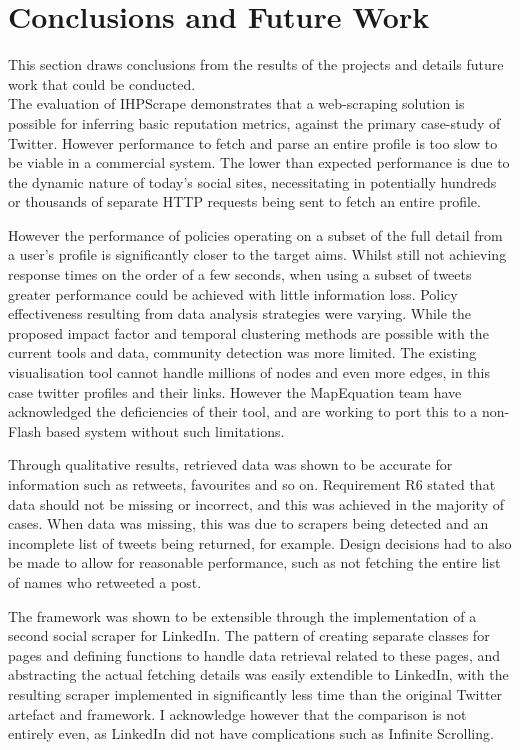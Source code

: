 \chapter{Conclusions and Future Work}\label{C:us}

This section draws conclusions from the results of the projects and details future work that could be conducted.\\

\noindent The evaluation of IHPScrape demonstrates that a web-scraping solution is possible for inferring basic reputation metrics, against the primary case-study of Twitter. However performance to fetch and parse an entire profile is too slow to be viable in a commercial system. The lower than expected performance is due to the dynamic nature of today's social sites, necessitating in potentially hundreds or thousands of separate HTTP requests being sent to fetch an entire profile. 

However the performance of policies operating on a subset of the full detail from a user's profile is significantly closer to the target aims. Whilst still not achieving response times on the order of a few seconds, when using a subset of tweets greater performance could be achieved with little information loss. Policy effectiveness resulting from data analysis strategies were varying. While the proposed impact factor and temporal clustering methods are possible with the current tools and data, community detection was more limited. The existing visualisation tool cannot handle millions of nodes and even more edges, in this case twitter profiles and their links. However the MapEquation team have acknowledged the deficiencies of their tool, and are working to port this to a non-Flash based system without such limitations. 

Through qualitative results, retrieved data was shown to be accurate for information such as retweets, favourites and so on. Requirement R6 stated that data should not be missing or incorrect, and this was achieved in the majority of cases. When data was missing, this was due to scrapers being detected and an incomplete list of tweets being returned, for example. Design decisions had to also be made to allow for reasonable performance, such as not fetching the entire list of names who retweeted a post. 

The framework was shown to be extensible through the implementation of a second social scraper for LinkedIn. The pattern of creating separate classes for pages and defining functions to handle data retrieval related to these pages, and abstracting the actual fetching details was easily extendible to LinkedIn, with the resulting scraper implemented in significantly less time than the original Twitter artefact and framework. I acknowledge however that the comparison is not entirely even, as LinkedIn did not have complications such as Infinite Scrolling. 

